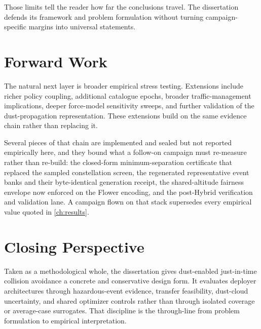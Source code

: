 Those limits tell the reader how far the conclusions travel. The dissertation defends its framework and problem formulation without turning campaign-specific margins into universal statements.

\section{Forward Work} \label{se:conclusions_remaining_work}

The natural next layer is broader empirical stress testing. Extensions include richer policy coupling, additional catalogue epochs, broader traffic-management implications, deeper force-model sensitivity sweeps, and further validation of the dust-propagation representation. These extensions build on the same evidence chain rather than replacing it.

Several pieces of that chain are implemented and sealed but not reported empirically here, and they bound what a follow-on campaign must re-measure rather than re-build: the closed-form minimum-separation certificate that replaced the sampled constellation screen, the regenerated representative event banks and their byte-identical generation receipt, the shared-altitude fairness envelope now enforced on the Flower encoding, and the post-Hybrid verification and validation lane. A campaign flown on that stack supersedes every empirical value quoted in \cref{ch:results}.

\section{Closing Perspective} \label{se:conclusions_closing}

Taken as a methodological whole, the dissertation gives dust-enabled just-in-time collision avoidance a concrete and conservative design form. It evaluates deployer architectures through hazardous-event evidence, transfer feasibility, dust-cloud uncertainty, and shared optimizer controls rather than through isolated coverage or average-case surrogates. That discipline is the through-line from problem formulation to empirical interpretation.
